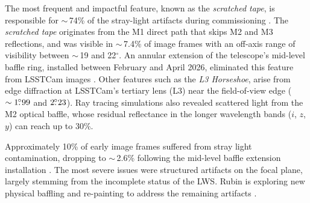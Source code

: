 The most frequent and impactful feature, known as the \textit{scratched tape}, is responsible for $\sim$\,74\% of the stray-light artifacts during commissioning \citep[][]{2026arXiv2606.31939}.
The \textit{scratched tape} originates from the M1 direct path that skips M2 and \gls{M3} reflections, and was visible in $\sim$\,7.4\% of image frames with an off-axis range of visibility between $\sim$\,19 and 22$^\circ$.
An annular extension of the telescope's mid-level baffle ring, installed between February and April 2026, eliminated this feature from \gls{LSSTCam} images \citep[][]{2026arXiv2606.31939}.
Other features such as the \textit{L3 Horseshoe}, arise from edge diffraction at \gls{LSSTCam}'s tertiary lens (\gls{L3}) near the field-of-view edge ($\sim1\mbox{\ensuremath{.\!\!^\circ}}99$ and $2\mbox{\ensuremath{.\!\!^\circ}}23$).
Ray tracing simulations also revealed scattered light from the \gls{M2} optical baffle, whose residual reflectance in the longer wavelength bands ($i$, $z$, $y$) can reach up to 30\%.

Approximately 10\% of early image frames suffered from stray light contamination, dropping to $\sim$\,2.6\% following the mid-level baffle extension installation \citep[][]{2026arXiv2606.31939}.
The most severe issues were structured artifacts on the focal plane, largely stemming from the incomplete status of the \gls{LWS}.
Rubin is exploring new physical baffling and re-painting to address the remaining artifacts \citep[][]{2026arXiv2606.31898, 2026arXiv2606.31793}.
